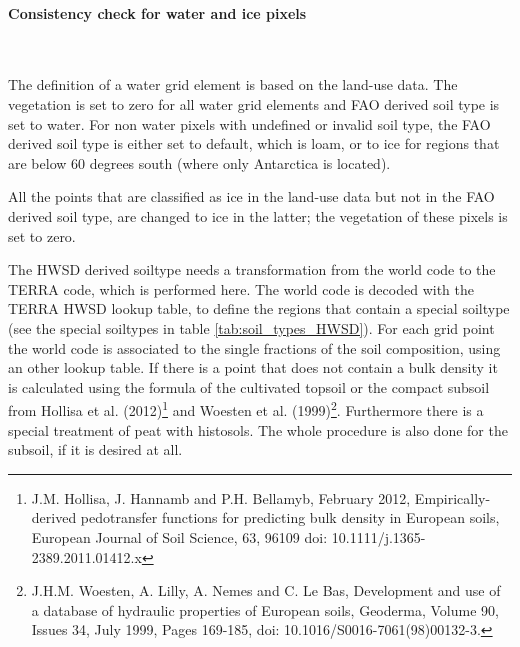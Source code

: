 \documentclass[a4paper,10pt,DIV14,BCOR1cm,titlepage,twoside]{scrartcl}
\begin{document}
\paragraph{Consistency check for water and ice pixels}\ \par\medskip\noindent
The definition of a water grid element is based on the land-use data. The vegetation is set to zero for all water grid elements and FAO derived soil type is set to water. For non water pixels with undefined or invalid soil type, the FAO derived soil type is either set to default, which is loam, or to ice for regions that are below 60 degrees south (where only Antarctica is located). \par\medskip\noindent
All the points that are classified as ice in the land-use data but not in the FAO derived soil type, are changed to ice in the latter; the vegetation of these pixels is set to zero.\par\medskip\noindent
The HWSD derived soiltype needs a transformation from the world code to the TERRA code, which is performed here. The world code is decoded with the TERRA HWSD lookup table, to define the regions that contain a special soiltype (see the special soiltypes in table \ref{tab:soil_types_HWSD}). For each grid point the world code is associated to the single fractions of the soil composition, using an other lookup table. If there is a point that does not contain a bulk density it is calculated using the formula of the cultivated topsoil or the compact subsoil from Hollisa et al. (2012)\footnote{J.M. Hollisa, J. Hannamb and P.H. Bellamyb, February 2012, Empirically-derived pedotransfer functions for predicting bulk density in European soils, European Journal of Soil Science, 63, 96109 doi: 10.1111/j.1365-2389.2011.01412.x} and Woesten et al. (1999)\footnote{J.H.M. Woesten, A. Lilly, A. Nemes and C. Le Bas, Development and use of a database of hydraulic properties of European soils, Geoderma, Volume 90, Issues 34, July 1999, Pages 169-185, doi: 10.1016/S0016-7061(98)00132-3.}. Furthermore there is a special treatment of peat with histosols. The whole procedure is also done for the subsoil, if it is desired at all.
\end{document}
